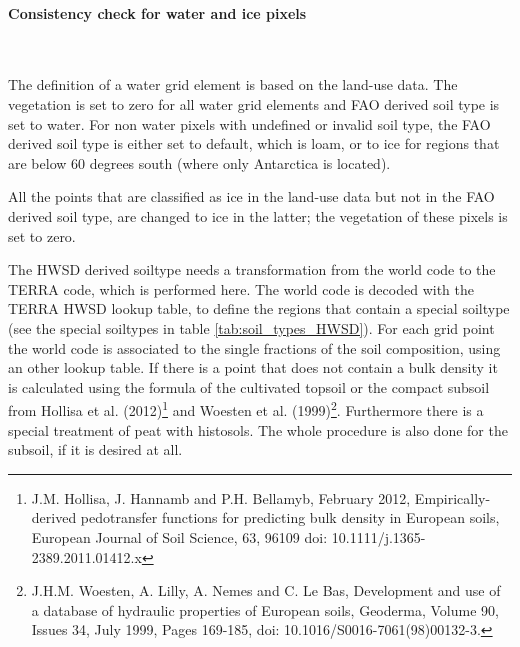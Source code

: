 \documentclass[a4paper,10pt,DIV14,BCOR1cm,titlepage,twoside]{scrartcl}
\begin{document}
\paragraph{Consistency check for water and ice pixels}\ \par\medskip\noindent
The definition of a water grid element is based on the land-use data. The vegetation is set to zero for all water grid elements and FAO derived soil type is set to water. For non water pixels with undefined or invalid soil type, the FAO derived soil type is either set to default, which is loam, or to ice for regions that are below 60 degrees south (where only Antarctica is located). \par\medskip\noindent
All the points that are classified as ice in the land-use data but not in the FAO derived soil type, are changed to ice in the latter; the vegetation of these pixels is set to zero.\par\medskip\noindent
The HWSD derived soiltype needs a transformation from the world code to the TERRA code, which is performed here. The world code is decoded with the TERRA HWSD lookup table, to define the regions that contain a special soiltype (see the special soiltypes in table \ref{tab:soil_types_HWSD}). For each grid point the world code is associated to the single fractions of the soil composition, using an other lookup table. If there is a point that does not contain a bulk density it is calculated using the formula of the cultivated topsoil or the compact subsoil from Hollisa et al. (2012)\footnote{J.M. Hollisa, J. Hannamb and P.H. Bellamyb, February 2012, Empirically-derived pedotransfer functions for predicting bulk density in European soils, European Journal of Soil Science, 63, 96109 doi: 10.1111/j.1365-2389.2011.01412.x} and Woesten et al. (1999)\footnote{J.H.M. Woesten, A. Lilly, A. Nemes and C. Le Bas, Development and use of a database of hydraulic properties of European soils, Geoderma, Volume 90, Issues 34, July 1999, Pages 169-185, doi: 10.1016/S0016-7061(98)00132-3.}. Furthermore there is a special treatment of peat with histosols. The whole procedure is also done for the subsoil, if it is desired at all.
\end{document}
